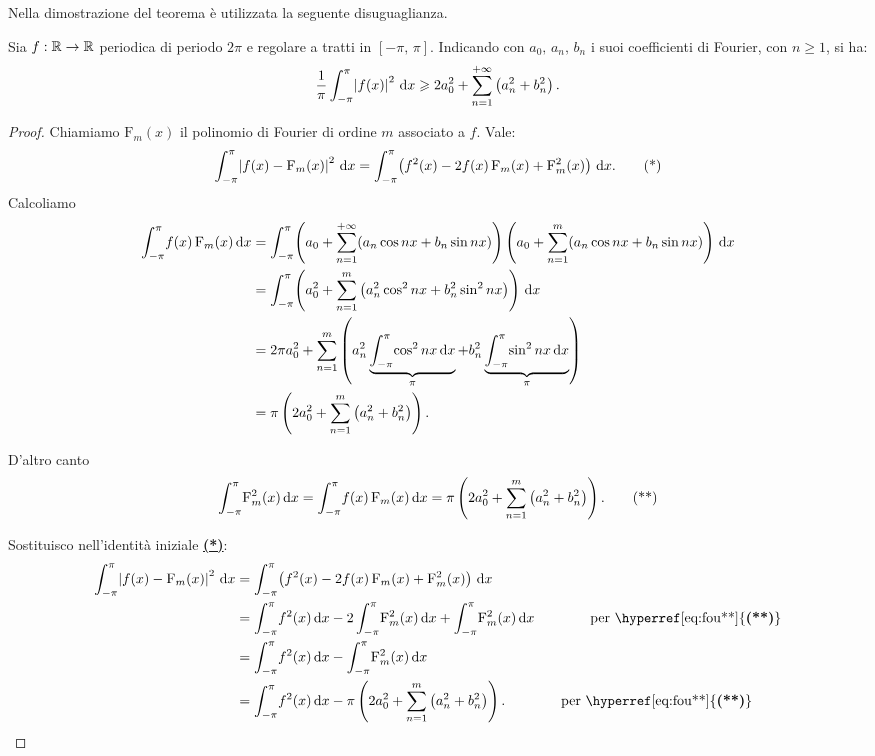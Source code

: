 \documentclass[../../analisi2]{subfiles}
\begin{document}
        Nella dimostrazione del teorema è utilizzata la seguente disuguaglianza.

        \begin{teorema}
            Sia \(f : \mathbb{R} \to \mathbb{R}\) periodica di periodo \(2\pi\) e regolare a tratti in \([-\pi, \, \pi]\). Indicando con
            \(a_0, \, a_n, \, b_n\) i suoi coefficienti di Fourier, con \(n \geqslant 1\), si ha:
            \[
                \frac{1}{\pi} \int_{-\pi}^{\pi} \! \left|f(x)\right|^2 \, \mathrm{d}x \geqslant 2 a_0^2 + \sum_{n = 1}^{+\infty} \left(a_n^2 + b_n^2\right).
            \]
        \end{teorema}
        \begin{proof}
            Chiamiamo \(\mathrm{F}_m (x)\) il polinomio di Fourier di ordine \(m\) associato a \(f\). Vale:
            \[
                \int_{-\pi}^{\pi} \! \left|f(x) - \mathrm{F}_m (x)\right|^2 \, \mathrm{d}x = \int_{-\pi}^{\pi} \! \left(f^2(x) - 2 f(x) \, \mathrm{F}_m (x) + \mathrm{F}_m^2 (x)\right) \, \mathrm{d}x.\tag{*}\label{eq:fou*}
            \]
            Calcoliamo
            \begin{align*}
                \int_{-\pi}^{\pi} \! f(x) \, \mathrm{F}_m (x) \, \mathrm{d}x &= \int_{-\pi}^{\pi} \! \left(a_0 + \sum_{n = 1}^{+\infty} (a_n \cos nx + b_n \sin nx)\right)
                    \left(a_0 + \sum_{n = 1}^{m} (a_n \cos nx + b_n \sin nx)\right) \, \mathrm{d}x\\
                &= \int_{-\pi}^{\pi} \! \left(a_0^2 + \sum_{n = 1}^m \left(a_n^2 \cos^2 nx + b_n^2 \sin^2 nx\right)\right) \, \mathrm{d}x\\
                &= 2\pi a_0^2 + \sum_{n = 1}^m \left(a_n^2 \underbrace{\int_{-\pi}^{\pi} \! \cos^2 nx \, \mathrm{d}x}_{\pi} + b_n^2 \underbrace{\int_{-\pi}^{\pi} \! \sin^2 nx \, \mathrm{d}x}_{\pi}\right)\\
                &= \pi \left(2 a_0^2 + \sum_{n = 1}^m \left(a_n^2 + b_n^2\right)\right).
            \end{align*}

            D'altro canto
            \[
                \int_{-\pi}^{\pi} \! \mathrm{F}_m^2 (x) \, \mathrm{d}x = \int_{-\pi}^{\pi} \! f(x) \, \mathrm{F}_m (x) \, \mathrm{d}x = \pi \left(2 a_0^2 + \sum_{n = 1}^m \left(a_n^2 + b_n^2\right)\right).\tag{**}\label{eq:fou**}
            \]

            Sostituisco nell'identità iniziale \hyperref[eq:fou*]{\textbf{(*)}}:
            \begin{align*}
                \intDef{-\pi}{\pi}{\left|f(x) - \mathrm{F}_m (x)\right|^2}{x} &= \intDef{-\pi}{\pi}{\left(f^2(x) - 2 f(x) \, \mathrm{F}_m (x) + \mathrm{F}_m^2 (x)\right)}{x}\\
                &= \intDef{-\pi}{\pi}{f^2 (x)}{x} - 2\intDef{-\pi}{\pi}{\mathrm{F}_m^2 (x)}{x} + \intDef{-\pi}{\pi}{\mathrm{F}_m^2 (x)}{x} \qquad\qquad \text{per \hyperref[eq:fou**]{\textbf{(**)}}}\\
                &= \intDef{-\pi}{\pi}{f^2 (x)}{x} - \intDef{-\pi}{\pi}{\mathrm{F}_m^2 (x)}{x}\\
                &= \intDef{-\pi}{\pi}{f^2(x)}{x} - \pi \left(2 a_0^2 + \sum_{n = 1}^m \left(a_n^2 + b_n^2\right)\right). \qquad\qquad \text{per \hyperref[eq:fou**]{\textbf{(**)}}}
            \end{align*}


\end{proof}
\end{document}

